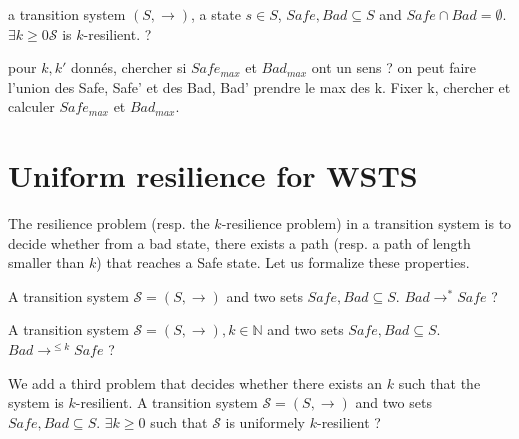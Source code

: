 {a transition system $(S,\rightarrow)$, a state $s \in S$, $Safe, Bad \subseteq S$ and $Safe \cap Bad = \emptyset$.}
{$\exists k \geq 0  \mathscr{S}$ is $k$-resilient. ?\newline}
\fi


pour $k,k'$ donnés, chercher si $Safe_{max}$ et $Bad_{max}$ ont un sens ? on peut faire l'union des Safe, Safe' et des Bad, Bad' prendre le max des k. Fixer k, chercher et calculer $Safe_{max}$ et $Bad_{max}$.

%

\section{Uniform resilience for WSTS}


The resilience problem (resp. the $k$-resilience problem) in a transition system is to decide whether from a bad state, there exists a path (resp. a path of length smaller than $k$) that reaches a Safe state. Let us formalize these properties.

{A transition system $\mathscr{S}=(S,\rightarrow)$ and two sets $Safe, Bad \subseteq S$.}
{$Bad \longrightarrow^{*} Safe$ ?\newline}
%

{A transition system $\mathscr{S}=(S,\rightarrow), k \in \mathbb{N}$ and two sets $Safe, Bad \subseteq S$.}
{$Bad \longrightarrow^{\leq k} Safe$ ?\newline}

We add a third problem that decides whether there exists an $k$ such  that the system is $k$-resilient.
%
{A transition system $\mathscr{S}=(S,\rightarrow)$ and two sets $Safe, Bad \subseteq S$.}
{$\exists k \geq 0$ such that $\mathscr{S}$ is uniformely $k$-resilient ?\newline}

